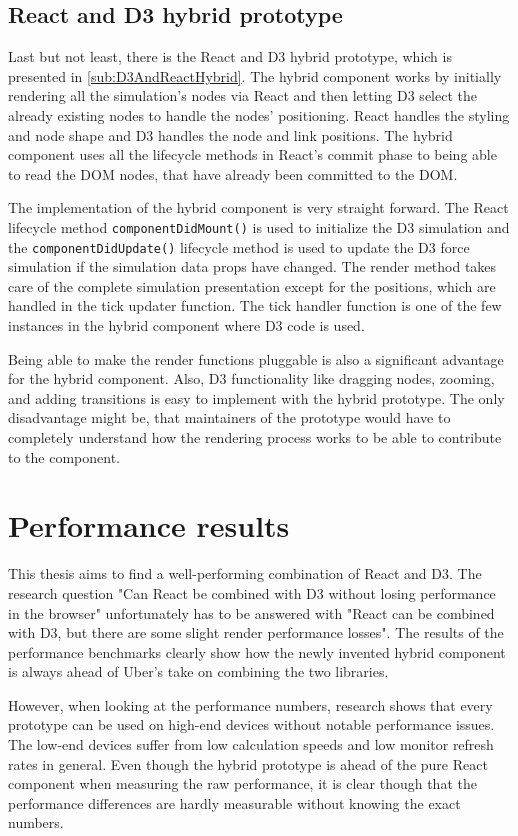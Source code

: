 \subsection{React and D3 hybrid prototype}

Last but not least, there is the React and D3 hybrid prototype, which is presented in \ref{sub:D3AndReactHybrid}. The hybrid component works by initially rendering all the simulation's nodes via React and then letting D3 select the already existing nodes to handle the nodes' positioning. React handles the styling and node shape and D3 handles the node and link positions. The hybrid component uses all the lifecycle methods in React's commit phase to being able to read the DOM nodes, that have already been committed to the DOM. 

The implementation of the hybrid component is very straight forward. The React lifecycle method \texttt{componentDidMount()} is used to initialize the D3 simulation and the \texttt{componentDidUpdate()} lifecycle method is used to update the D3 force simulation if the simulation data props have changed. The render method takes care of the complete simulation presentation except for the positions, which are handled in the tick updater function. The tick handler function is one of the few instances in the hybrid component where D3 code is used.

Being able to make the render functions pluggable is also a significant advantage for the hybrid component. Also, D3 functionality like dragging nodes, zooming, and adding transitions is easy to implement with the hybrid prototype. The only disadvantage might be, that maintainers of the prototype would have to completely understand how the rendering process works to be able to contribute to the component.

\section{Performance results}

This thesis aims to find a well-performing combination of React and D3. The research question "Can React be combined with D3 without losing performance in the browser" unfortunately has to be answered with "React can be combined with D3, but there are some slight render performance losses". The results of the performance benchmarks clearly show how the newly invented hybrid component is always ahead of Uber's take on combining the two libraries. 

However, when looking at the performance numbers, research shows that every prototype can be used on high-end devices without notable performance issues. The low-end devices suffer from low calculation speeds and low monitor refresh rates in general. Even though the hybrid prototype is ahead of the pure React component when measuring the raw performance, it is clear though that the performance differences are hardly measurable without knowing the exact numbers.

